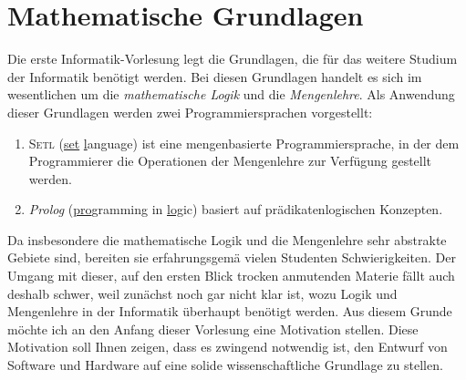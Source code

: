 \chapter{Mathematische Grundlagen} 
Die erste Informatik-Vorlesung legt die Grundlagen, die f\"{u}r das weitere Studium
der Informatik ben\"{o}tigt werden.  Bei diesen Grundlagen handelt es sich im wesentlichen
um die \emph{mathematische Logik} und die \emph{Mengenlehre}.  
Als Anwendung dieser Grundlagen werden zwei Programmiersprachen vorgestellt:
\begin{enumerate}
\item \textsc{Setl} (\underline{set} \underline{l}anguage) ist eine mengenbasierte
      Programmiersprache, in der dem Programmierer 
      die Operationen der Mengenlehre zur Verf\"{u}gung gestellt werden.
\item \textsl{Prolog} (\underline{pro}gramming in \underline{log}ic) basiert
      auf pr\"{a}dikatenlogischen Konzepten.
\end{enumerate}
Da insbesondere die mathematische Logik und die
Mengenlehre sehr abstrakte Gebiete sind, bereiten sie erfahrungsgem\"{a}\3 vielen Studenten
Schwierigkeiten.  Der Umgang mit dieser, auf den ersten Blick trocken anmutenden Materie f\"{a}llt
auch deshalb schwer, weil zun\"{a}chst noch gar nicht klar ist, wozu Logik und Mengenlehre in der
Informatik \"{u}berhaupt ben\"{o}tigt werden.  Aus diesem Grunde m\"{o}chte ich an den Anfang dieser
Vorlesung eine Motivation stellen. Diese Motivation soll Ihnen zeigen, dass es zwingend
notwendig ist, den Entwurf von Software und Hardware auf eine solide wissenschaftliche
Grundlage zu stellen. 


